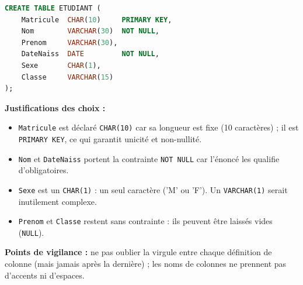 \documentclass[11pt]{article}
\begin{document}
\begin{corrige}
\begin{lstlisting}[language=SQL]
CREATE TABLE ETUDIANT (
    Matricule  CHAR(10)     PRIMARY KEY,
    Nom        VARCHAR(30)  NOT NULL,
    Prenom     VARCHAR(30),
    DateNaiss  DATE         NOT NULL,
    Sexe       CHAR(1),
    Classe     VARCHAR(15)
);
\end{lstlisting}

\textbf{Justifications des choix :}
\begin{itemize}
    \item \texttt{Matricule} est déclaré \texttt{CHAR(10)} car sa longueur est fixe (10 caractères) ; il est \texttt{PRIMARY KEY}, ce qui garantit unicité et non-nullité.
    \item \texttt{Nom} et \texttt{DateNaiss} portent la contrainte \texttt{NOT NULL} car l'énoncé les qualifie d'obligatoires.
    \item \texttt{Sexe} est un \texttt{CHAR(1)} : un seul caractère ('M' ou 'F'). Un \texttt{VARCHAR(1)} serait inutilement complexe.
    \item \texttt{Prenom} et \texttt{Classe} restent sans contrainte : ils peuvent être laissés vides (\texttt{NULL}).
\end{itemize}

\textbf{Points de vigilance :} ne pas oublier la virgule entre chaque définition de colonne (mais jamais après la dernière) ; les noms de colonnes ne prennent pas d'accents ni d'espaces.
\end{corrige}
\end{document}
